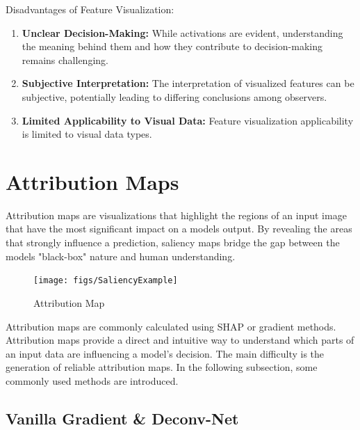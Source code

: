 Disadvantages of Feature Visualization:
\begin{enumerate}
	\item \textbf{Unclear Decision-Making:} While activations are evident, understanding the meaning behind them and how they contribute to decision-making remains challenging.
	\item \textbf{Subjective Interpretation:} The interpretation of visualized features can be subjective, potentially leading to differing conclusions among observers.
	\item \textbf{Limited Applicability to Visual Data:} Feature visualization applicability is limited to visual data types.
\end{enumerate}


\section{Attribution Maps}
\label{sec:saliency}
Attribution maps are visualizations that highlight the regions of an input image that have the most significant impact on a models output. By revealing the areas that strongly influence a prediction, saliency maps bridge the gap between the models "black-box" nature and human understanding.

\begin{figure}[h!]
	\centering
	\texttt{[image: figs/SaliencyExample]}
	\caption{Attribution Map \cite{captum}}
	\label{fig:saliency}
\end{figure}

Attribution maps are commonly calculated using SHAP \cite{lundberg2017unified} or gradient methods. Attribution maps provide a direct and intuitive way to understand which parts of an input data are influencing a model's decision. The main difficulty is the generation of reliable attribution maps. In the following subsection, some commonly used methods are introduced. 

\subsection{Vanilla Gradient \& Deconv-Net}
\label{IG}

